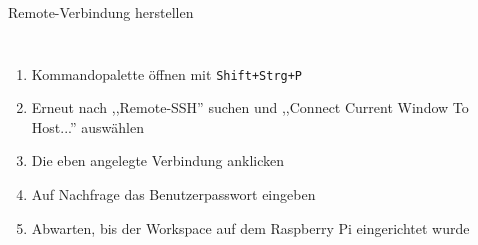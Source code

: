{{\begin{frame}{Remote-Verbindung herstellen}
    \framebreak

    \begin{columns}





        \begin{enumerate}
            \item Kommandopalette öffnen mit \texttt{Shift+Strg+P}
            \item Erneut nach ,,Remote-SSH'' suchen und ,,Connect Current Window To Host...'' auswählen
            \item Die eben angelegte Verbindung anklicken
            \item Auf Nachfrage das Benutzerpasswort eingeben
            \item Abwarten, bis der Workspace auf dem Raspberry Pi eingerichtet wurde
        \end{enumerate}
    \end{columns}
\end{frame}
}

}
